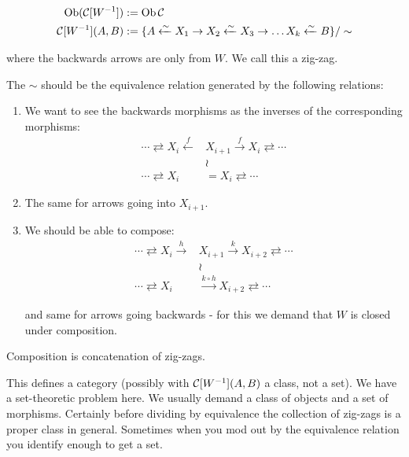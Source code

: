 \documentclass[class=report, crop=false,a4paper,twoside]{standalone}
\begin{document}
\begin{align*}
	\operatorname{Ob}(\mathcal{C}[W^{-1}]) &:= \operatorname{Ob}\mathcal{C} \\
	\mathcal{C}[W^{-1}](A,B) &:= \{A \xleftarrow{\sim} X_1 \to X_2 \xleftarrow{\sim} X_3 \to \dots X_k \xleftarrow{\sim} B\}/\sim
\end{align*}

 where the backwards arrows are only from $W$. We call this a zig-zag.

The $\sim$ should be the equivalence relation generated by the following relations:
\begin{enumerate}
	\item We want to see the backwards morphisms as the inverses of the corresponding morphisms:
	\begin{align*}
		\cdots \rightleftarrows X_i \xleftarrow{f} &X_{i+1} \xrightarrow{f} X_i \rightleftarrows \cdots\\
		&\wr\\
		\cdots \rightleftarrows X_i &= X_i \rightleftarrows \cdots
	\end{align*}

	\item The same for arrows going into $X_{i+1}$.

	\item We should be able to compose:
	\begin{align*}
	\cdots \rightleftarrows X_i \xrightarrow{h} &X_{i+1} \xrightarrow{k} X_{i+2} \rightleftarrows \cdots\\
	&\wr\\
	\cdots \rightleftarrows X_i &\xrightarrow{k \circ h} X_{i+2} \rightleftarrows \cdots	
	\end{align*}

	and same for arrows going backwards - for this we demand that $W$ is closed under composition.
\end{enumerate}

Composition is concatenation of zig-zags.

\begin{exercise}
	This defines a category (possibly with $\mathcal{C}[W^{-1}](A,B)$ a class, not a set). We have a set-theoretic problem here. We usually demand a class of objects and a set of morphisms. Certainly before dividing by equivalence the collection of zig-zags is a proper class in general. Sometimes when you mod out by the equivalence relation you identify enough to get a set. 
\end{exercise}
\end{document}

